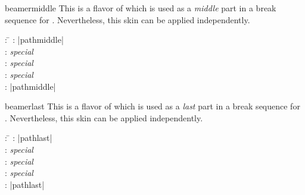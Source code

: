 \begin{dispExample}
\end{dispExample}


\medskip

\begin{docSkin}{beamermiddle}
This is a flavor of  which is used as a \emph{middle} part
in a break sequence for .
Nevertheless, this skin can be applied independently.
\begin{tcolorbox}[skintable=beamermiddle]
  \begin{tabbing}
    : \=\kill
    :           \> |pathmiddle|\\
    : \> \emph{special}\\ 
    :        \> \emph{special}\\
    :    \> \emph{special}\\
    :           \> |pathmiddle|
  \end{tabbing}
\end{tcolorbox}
\end{docSkin}


\begin{dispExample}
\end{dispExample}


\clearpage
\begin{docSkin}{beamerlast}
This is a flavor of  which is used as a \emph{last} part
in a break sequence for .
Nevertheless, this skin can be applied independently.
\begin{tcolorbox}[skintable=beamerlast]
  \begin{tabbing}
    : \=\kill
    :           \> |pathlast|\\
    : \> \emph{special}\\ 
    :        \> \emph{special}\\
    :    \> \emph{special}\\
    :           \> |pathlast|
  \end{tabbing}
\end{tcolorbox}
\end{docSkin}

